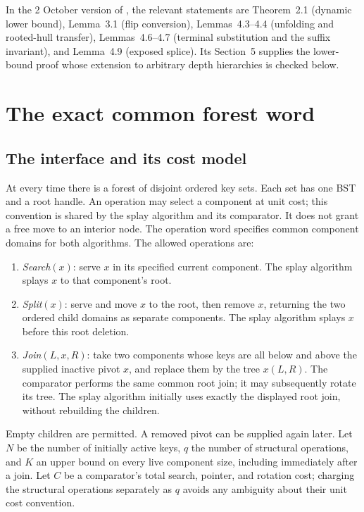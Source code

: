 \documentclass[11pt]{article}
\numberwithin{equation}{section}
\begin{document}
In the 2 October version of \cite{ChaCha}, the relevant statements are
Theorem~2.1 (dynamic lower bound), Lemma~3.1 (flip conversion),
Lemmas~4.3--4.4 (unfolding and rooted-hull transfer),
Lemmas~4.6--4.7 (terminal substitution and the suffix invariant),
and Lemma~4.9 (exposed splice). Its Section~5 supplies the lower-bound
proof whose extension to arbitrary depth hierarchies is checked below.

\section{The exact common forest word}\label{sec:word}
\subsection{The interface and its cost model}

At every time there is a forest of disjoint ordered key sets. Each set
has one BST and a root handle. An operation may select a component at
unit cost; this convention is shared by the splay algorithm and its
comparator. It does not grant a free move to an interior node. The
operation word specifies common component domains for both algorithms.
The allowed operations are:
\begin{enumerate}
\item \emph{Search}$(x)$: serve $x$ in its specified current component.
The splay algorithm splays $x$ to that component's root.
\item \emph{Split}$(x)$: serve and move $x$ to the root, then remove
$x$, returning the two ordered child domains as separate components.
The splay algorithm splays $x$ before this root deletion.
\item \emph{Join}$(L,x,R)$: take two components whose keys are all
below and above the supplied inactive pivot $x$, and replace them by
the tree $x(L,R)$. The comparator performs the same common root join;
it may subsequently rotate its tree. The splay algorithm initially
uses exactly the displayed root join, without rebuilding the children.
\end{enumerate}
Empty children are permitted. A removed pivot can be supplied again
later. Let $N$ be the number of initially active keys, $q$ the number of
structural operations, and $K$ an upper bound on every live component
size, including immediately after a join. Let $C$ be a comparator's
total search, pointer, and rotation cost; charging the structural
operations separately as $q$ avoids any ambiguity about their unit
cost convention.
\end{document}
